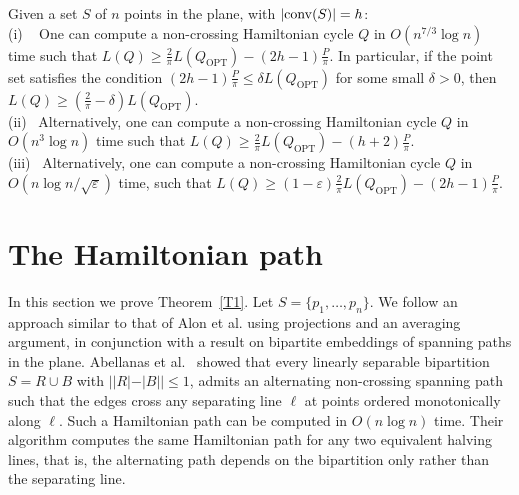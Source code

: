 \documentclass[proceedings]{stacs}
\newcommand{\old}[1]{{}}
\def\eps{\varepsilon}
\begin{document}
\old{
Although our improvement in the approximation ratio for spanning trees
is very small, it shows that the ``barrier'' of $1/2$ can be broken.
Also, while from a practical standpoint the improvement
in the running time is the most significant aspect, from a theoretical
perspective the improvement in the approximation ratio is the most
challenging part of our result.
} 

\begin{theorem} \label{T3}
Given a set $S$ of $n$ points in the plane, with $|{\rm conv}(S)|=h$: \\
{\rm (i) \ } One can
compute a  non-crossing Hamiltonian cycle $Q$ in $O(n^{7/3}\log{n})$
time such that $L(Q) \geq \frac{2}{\pi}L(Q_\textrm{OPT})-(2h-1) \frac{P}{\pi}$.
In particular, if the point set satisfies the condition
$(2h-1) \frac{P}{\pi} \leq \delta L(Q_\textrm{OPT})$
for some small $\delta>0$,
then $L(Q) \geq \left(\frac{2}{\pi}-\delta\right) L(Q_\textrm{OPT})$. \\
{\rm (ii)\ } Alternatively,  one can compute a non-crossing
Hamiltonian cycle $Q$ in  $O(n^3 \log{n})$ time such that $L(Q) \geq
\frac{2}{\pi}L(Q_\textrm{OPT})- (h+2) \frac{P}{\pi}$. \\
{\rm (iii)\ } Alternatively, one can compute a  non-crossing
Hamiltonian cycle $Q$ in $O(n \log{n}/\sqrt{\eps})$ time, such that
$L(Q) \geq (1-\eps)\frac{2}{\pi}L(Q_\textrm{OPT})-(2h-1) \frac{P}{\pi}$.
\end{theorem}



\section{The Hamiltonian path} \label{sec:path}

In this section we prove Theorem~\ref{T1}. Let $S=\{p_1,\ldots,p_n\}$.
We follow an approach similar to that of Alon et al. using projections and
an averaging argument, in conjunction with a result on bipartite
embeddings of spanning paths in the plane. Abellanas et
al.~\cite[Theorem~3.1]{AGH+99} showed that every linearly separable bipartition
$S=R \cup B$ with $||R|-|B|| \leq 1$, admits an alternating non-crossing
spanning path such that the edges cross any separating line $\ell$ at points
ordered monotonically along $\ell$. Such a Hamiltonian path can be computed
in $O(n \log{n})$ time. Their algorithm computes the same Hamiltonian path for
any two equivalent halving lines, that is, the alternating path depends on the
bipartition only rather than the separating line.
\end{document}
